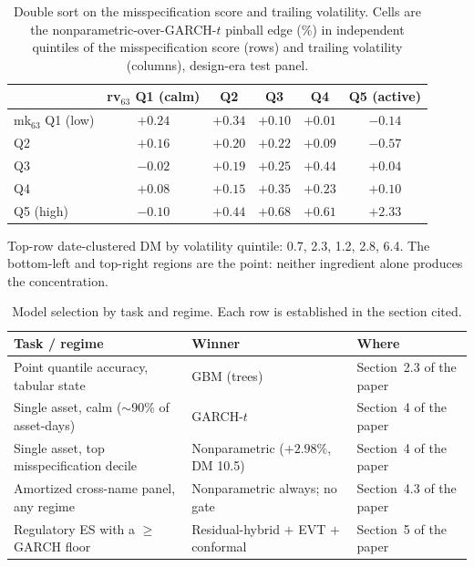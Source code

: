 \documentclass[11pt]{article}
\begin{document}
\begin{table}[htbp]
\centering
\begin{threeparttable}
\caption{Double sort on the misspecification score and trailing volatility. Cells are the nonparametric-over-GARCH-$t$ pinball edge (\%)
in independent quintiles of the misspecification score (rows) and
trailing volatility (columns), design-era test panel.}
\label{tab:doublesort}
\footnotesize\setlength{\tabcolsep}{5pt}
\begin{tabular}{lccccc}
\toprule
 & rv$_{63}$ Q1 (calm) & Q2 & Q3 & Q4 & Q5 (active) \\
\midrule
mk$_{63}$ Q1 (low) & $+0.24$ & $+0.34$ & $+0.10$ & $+0.01$ & $-0.14$ \\
Q2 & $+0.16$ & $+0.20$ & $+0.22$ & $+0.09$ & $-0.57$ \\
Q3 & $-0.02$ & $+0.19$ & $+0.25$ & $+0.44$ & $+0.04$ \\
Q4 & $+0.08$ & $+0.15$ & $+0.35$ & $+0.23$ & $+0.10$ \\
Q5 (high) & $-0.10$ & $+0.44$ & $+0.68$ & $+0.61$ & $\mathbf{+2.33}$ \\
\bottomrule
\end{tabular}
\begin{tablenotes}\footnotesize
\item Top-row date-clustered DM by volatility quintile: 0.7, 2.3, 1.2,
2.8, 6.4. The bottom-left and top-right regions are the point:
neither ingredient alone produces the concentration.
\end{tablenotes}
\end{threeparttable}
\end{table}
\begin{table}[htbp]
\centering\small
\caption{Model selection by task and regime.
Each row is established in the section cited.}
\label{tab:decision}
\begin{tabular}{p{}p{}l}
\toprule
Task / regime & Winner & Where \\
\midrule
Point quantile accuracy, tabular state & GBM (trees) & Section~2.3 of the paper \\
Single asset, calm ($\sim$90\% of asset-days) & GARCH-$t$ & Section~4 of the paper \\
Single asset, top misspecification decile & Nonparametric ($+2.98\%$, DM 10.5) & Section~4 of the paper \\
Amortized cross-name panel, any regime & Nonparametric always; no gate & Section~4.3 of the paper \\
Regulatory ES with a $\ge$GARCH floor & Residual-hybrid $+$ EVT $+$ conformal & Section~5 of the paper \\
\bottomrule
\end{tabular}
\end{table}
\end{document}
